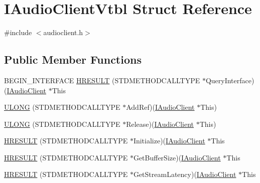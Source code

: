 \hypertarget{struct_i_audio_client_vtbl}{}\section{I\+Audio\+Client\+Vtbl Struct Reference}
\label{struct_i_audio_client_vtbl}


{\ttfamily \#include $<$audioclient.\+h$>$}

\subsection*{Public Member Functions}
\begin{DoxyCompactItemize}
\item 
B\+E\+G\+I\+N\+\_\+\+I\+N\+T\+E\+R\+F\+A\+CE \hyperlink{struct_i_audio_client_vtbl_abc3f79ac770baec44ef984e2d467203f}{H\+R\+E\+S\+U\+LT} (S\+T\+D\+M\+E\+T\+H\+O\+D\+C\+A\+L\+L\+T\+Y\+PE $\ast$Query\+Interface)(\hyperlink{audioclient_8h_ace13012ab56d9326b7aabeab5d477652}{I\+Audio\+Client} $\ast$This
\item 
\hyperlink{struct_i_audio_client_vtbl_afd684ccffd33964cb213d2da7ffb12f7}{U\+L\+O\+NG} (S\+T\+D\+M\+E\+T\+H\+O\+D\+C\+A\+L\+L\+T\+Y\+PE $\ast$Add\+Ref)(\hyperlink{audioclient_8h_ace13012ab56d9326b7aabeab5d477652}{I\+Audio\+Client} $\ast$This)
\item 
\hyperlink{struct_i_audio_client_vtbl_a8a50860f5307389146317b3fa7a5afe5}{U\+L\+O\+NG} (S\+T\+D\+M\+E\+T\+H\+O\+D\+C\+A\+L\+L\+T\+Y\+PE $\ast$Release)(\hyperlink{audioclient_8h_ace13012ab56d9326b7aabeab5d477652}{I\+Audio\+Client} $\ast$This)
\item 
\hyperlink{struct_i_audio_client_vtbl_ac65551a3df9f91927da6ec3953c2f575}{H\+R\+E\+S\+U\+LT} (S\+T\+D\+M\+E\+T\+H\+O\+D\+C\+A\+L\+L\+T\+Y\+PE $\ast$Initialize)(\hyperlink{audioclient_8h_ace13012ab56d9326b7aabeab5d477652}{I\+Audio\+Client} $\ast$This
\item 
\hyperlink{struct_i_audio_client_vtbl_a1bd4f582f7afbc917ca06fe9e029f78c}{H\+R\+E\+S\+U\+LT} (S\+T\+D\+M\+E\+T\+H\+O\+D\+C\+A\+L\+L\+T\+Y\+PE $\ast$Get\+Buffer\+Size)(\hyperlink{audioclient_8h_ace13012ab56d9326b7aabeab5d477652}{I\+Audio\+Client} $\ast$This
\item 
\hyperlink{struct_i_audio_client_vtbl_ac800722606c0ca36274aec8d70740e8a}{H\+R\+E\+S\+U\+LT} (S\+T\+D\+M\+E\+T\+H\+O\+D\+C\+A\+L\+L\+T\+Y\+PE $\ast$Get\+Stream\+Latency)(\hyperlink{audioclient_8h_ace13012ab56d9326b7aabeab5d477652}{I\+Audio\+Client} $\ast$This
\item 

\end{DoxyCompactItemize}

